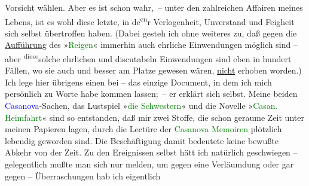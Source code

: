                Vorsicht wählen. Aber es ist schon wahr, – unter den zahlreichen Affairen meines
               Lebens, ist es wohl diese letzte, in de\substVorne{}\textsuperscript{en}\substDazwischen{}r\substHinten{} Verlogenheit, Unverstand und Feigheit sich selbst übertroffen haben. (Dabei
               gesteh ich ohne weiteres zu, daß gegen die \uline{Aufführung}
               des »\textcolor{green}{Reigen}{}\ledrightnote{\textcolor{green}{Reigen. Zehn Dialoge}}« immerhin auch ehrliche Einwendungen
               möglich sind – aber \substVorne{}\textsuperscript{diese}\substDazwischen{}solche\substHinten{} ehrlichen und discutabeln Einwendungen sind eben in hundert Fällen, wo sie
               auch und besser am Platze gewesen wären, \uline{nicht}
               erhoben worden.) Ich lege hier übrigens einen \label{K_L02376_2v}\label{K_L02376_2h} bei – das einzige Document, in dem ich 
               mich \introOben{}persönlich\introOben{} zu Worte habe kommen lassen; – er erklärt
               sich selbst.\pend
           \pstart
           {\pb}Meine beiden \textcolor{blue}{Casanova}{}\ledrightnote{\textcolor{blue}{Giacomo Girolamo Casanova}}-Sachen, das Lustspiel »\textcolor{green}{die
                  Schwestern}{}\ledrightnote{\textcolor{green}{Die Schwestern oder Casanova in Spa. Lustspiel in Versen}}« und die Novelle »\textcolor{green}{Casan.
                  Heimfahrt}{}\ledrightnote{\textcolor{green}{Casanovas Heimfahrt}}« sind so entstanden, daß mir zwei Stoffe, die schon geraume Zeit
               unter meinen Papieren lagen, durch die Lectüre der \textcolor{green}{Casanova Memoiren}{} plötzlich lebendig geworden sind. Die
               Beschäftigung damit bedeutete keine bewußte Abkehr von der Zeit. Zu den Ereignissen
               selbst hätt ich natürlich geschwiegen – gelegentlich mußte man sich nur melden, um
               gegen eine Verläumdung oder gar gegen \label{K_L02376_3v}\label{K_L02376_3h} – Überraschungen hab ich eigentlich

